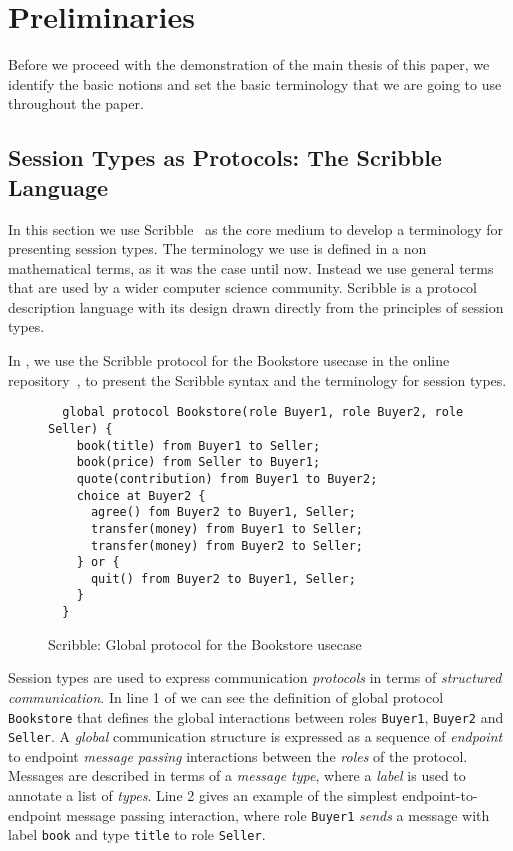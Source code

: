 \section{Preliminaries}
\label{sec:preliminaries}

Before we proceed with the demonstration of the main thesis
of this paper, we identify the basic notions and set the basic
terminology that we are going to use throughout the paper.

\subsection{Session Types as Protocols: The Scribble Language}

In this section we use Scribble~\cite{scribble} as the core
medium to develop a terminology for presenting session types.
The terminology we use is defined in a non mathematical terms,
as it was the case until now. Instead we use general terms
that are used by a wider computer science community.
Scribble is a protocol description language with its design
drawn directly from the principles of session types.

In , we use the Scribble protocol for the
Bookstore usecase in the online repository~\cite{usecase_repository},
to present the Scribble syntax and the terminology for session types.

\begin{figure}[t]
\begin{lstlisting}
  global protocol Bookstore(role Buyer1, role Buyer2, role Seller) {
    book(title) from Buyer1 to Seller;
    book(price) from Seller to Buyer1;
    quote(contribution) from Buyer1 to Buyer2;
    choice at Buyer2 {
      agree() fom Buyer2 to Buyer1, Seller;
      transfer(money) from Buyer1 to Seller;
      transfer(money) from Buyer2 to Seller;
    } or {
      quit() from Buyer2 to Buyer1, Seller;
    }
  }
\end{lstlisting}
\caption{Scribble: Global protocol for the Bookstore usecase}
\label{fig:scribble_bs}
\end{figure}



Session types are used to express communication
{\em protocols} in terms of {\em structured communication}.
In line 1 of  we can see the definition 
of global protocol \lstinline|Bookstore| that defines 
the global interactions between roles \lstinline|Buyer1|,
\lstinline|Buyer2| and \lstinline|Seller|.
A {\em global} communication structure is expressed 
as a sequence of {\em endpoint} to endpoint {\em message passing}
interactions between the {\em roles} of the protocol.
Messages are described in terms of a {\em message type},
where  a {\em label} is used to annotate a list
of {\em types}.
Line 2 gives an example of the simplest endpoint-to-endpoint message
passing interaction,
where role \lstinline|Buyer1| {\em sends} a message with
label \lstinline|book| and type \lstinline|title| to role
\lstinline{Seller}.

